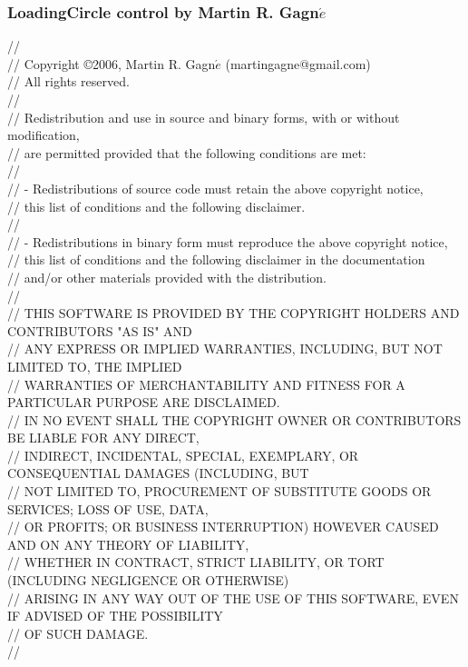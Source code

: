 \documentclass{article}
\begin{document}
\subsubsection{LoadingCircle control by Martin R. Gagn$\acute{e}$}
\begin{small}
\begin{flushleft}
//\\
// Copyright \copyright 2006, Martin R. Gagn$\acute{e}$ (martingagne@gmail.com)\\
// All rights reserved.\\
//\\
// Redistribution and use in source and binary forms, with or without modification, \\
// are permitted provided that the following conditions are met:\\
//\\
//   - Redistributions of source code must retain the above copyright notice, \\
//     this list of conditions and the following disclaimer.\\
//\\
//   - Redistributions in binary form must reproduce the above copyright notice, \\
//     this list of conditions and the following disclaimer in the documentation \\
//     and/or other materials provided with the distribution.\\
// \\
// THIS SOFTWARE IS PROVIDED BY THE COPYRIGHT HOLDERS AND CONTRIBUTORS "AS IS" AND \\
// ANY EXPRESS OR IMPLIED WARRANTIES, INCLUDING, BUT NOT LIMITED TO, THE IMPLIED \\
// WARRANTIES OF MERCHANTABILITY AND FITNESS FOR A PARTICULAR PURPOSE ARE DISCLAIMED. \\
// IN NO EVENT SHALL THE COPYRIGHT OWNER OR CONTRIBUTORS BE LIABLE FOR ANY DIRECT, \\
// INDIRECT, INCIDENTAL, SPECIAL, EXEMPLARY, OR CONSEQUENTIAL DAMAGES (INCLUDING, BUT \\
// NOT LIMITED TO, PROCUREMENT OF SUBSTITUTE GOODS OR SERVICES; LOSS OF USE, DATA, \\
// OR PROFITS; OR BUSINESS INTERRUPTION) HOWEVER CAUSED AND ON ANY THEORY OF LIABILITY, \\
// WHETHER IN CONTRACT, STRICT LIABILITY, OR TORT (INCLUDING NEGLIGENCE OR OTHERWISE) \\
// ARISING IN ANY WAY OUT OF THE USE OF THIS SOFTWARE, EVEN IF ADVISED OF THE POSSIBILITY \\
// OF SUCH DAMAGE.\\
//\\
\end{flushleft}
\end{small}
\end{document}

